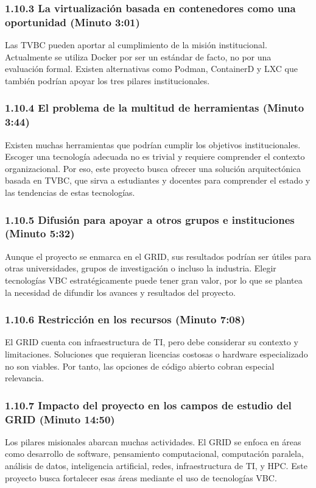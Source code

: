 \subsubsection*{1.10.3 La virtualización basada en contenedores como una oportunidad (Minuto 3:01)}
Las TVBC pueden aportar al cumplimiento de la misión institucional. Actualmente se utiliza Docker por ser un estándar de facto, no por una evaluación formal. Existen alternativas como Podman, ContainerD y LXC que también podrían apoyar los tres pilares institucionales.

\subsubsection*{1.10.4 El problema de la multitud de herramientas (Minuto 3:44)}
Existen muchas herramientas que podrían cumplir los objetivos institucionales. Escoger una tecnología adecuada no es trivial y requiere comprender el contexto organizacional. Por eso, este proyecto busca ofrecer una solución arquitectónica basada en TVBC, que sirva a estudiantes y docentes para comprender el estado y las tendencias de estas tecnologías.

\subsubsection*{1.10.5 Difusión para apoyar a otros grupos e instituciones (Minuto 5:32)}
Aunque el proyecto se enmarca en el GRID, sus resultados podrían ser útiles para otras universidades, grupos de investigación o incluso la industria. Elegir tecnologías VBC estratégicamente puede tener gran valor, por lo que se plantea la necesidad de difundir los avances y resultados del proyecto.

\subsubsection*{1.10.6 Restricción en los recursos (Minuto 7:08)}
El GRID cuenta con infraestructura de TI, pero debe considerar su contexto y limitaciones. Soluciones que requieran licencias costosas o hardware especializado no son viables. Por tanto, las opciones de código abierto cobran especial relevancia.

\subsubsection*{1.10.7 Impacto del proyecto en los campos de estudio del GRID (Minuto 14:50)}
Los pilares misionales abarcan muchas actividades. El GRID se enfoca en áreas como desarrollo de software, pensamiento computacional, computación paralela, análisis de datos, inteligencia artificial, redes, infraestructura de TI, y HPC. Este proyecto busca fortalecer esas áreas mediante el uso de tecnologías VBC.

